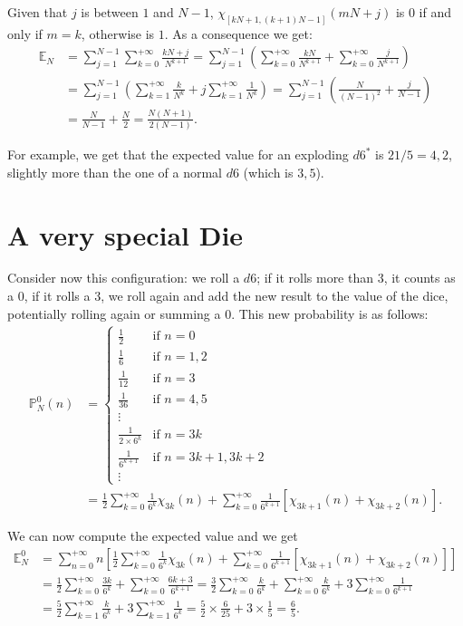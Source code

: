 \documentclass[a4paper,oneside,11pt]{book}
\renewcommand{\Pr}{\mathbb{P}}
\begin{document}
Given that $j$ is between $1$ and $N-1$, $\chi_{[kN+1,\left(k+1\right)N-1]}\left(mN+j\right)$ is $0$ if and only if $m=k$, otherwise is $1$. As a consequence we get:
\begin{align}
	\mathbb{E}_N&=\sum_{j=1}^{N-1}\sum_{k=0}^{+\infty}\frac{kN+j}{N^{k+1}}
	=\sum_{j=1}^{N-1}
	\left(
		\sum_{k=0}^{+\infty}\frac{kN}{N^{k+1}}
		+\sum_{k=0}^{+\infty}\frac{j}{N^{k+1}}
	\right)
\\
	&=\sum_{j=1}^{N-1}
	\left(
		\sum_{k=1}^{+\infty}\frac{k}{N^{k}}
		+j\sum_{k=1}^{+\infty}\frac1{N^k}
	\right)
	=\sum_{j=1}^{N-1}
	\left(
		\frac N{\left(N-1\right)^2}
		+\frac j{N-1}
	\right)
\\
	&=\frac N{N-1}
	+\frac N2
	=\frac{N\left(N+1\right)}{2\left(N-1\right)}.
\end{align}

For example, we get that the expected value for an exploding $d6^*$ is $21/5=4,2$, slightly more than the one of a normal $d6$ (which is $3,5$).

\section{A very special Die}
Consider now this configuration: we roll a $d6$; if it rolls more than $3$, it counts as a $0$, if it rolls a $3$, we roll again and add the new result to the value of the dice, potentially rolling again or summing a $0$. This new probability is as follows:
\begin{align}
	\Pr_N^0\left(n\right)
	&=\left\{\begin{array}{cl}
		\frac12 							& \mbox{if } n=0	\\
		\frac16 							& \mbox{if } n=1,2	\\
		\frac1{12} 						& \mbox{if } n=3	\\
		\frac1{36} 						& \mbox{if } n=4,5	\\
		\vdots								&	\\
		\frac1{2\times6^{k}} 	& \mbox{if } n=3k	\\
		\frac1{6^{k+1}} 			& \mbox{if } n=3k+1,3k+2	\\
		\vdots
	\end{array}\right.
\\
	&=\frac12\sum_{k=0}^{+\infty}\frac1{6^k}\chi_{3k}(n)
	+\sum_{k=0}^{+\infty}\frac1{6^{k+1}}
	\left[
		\chi_{3k+1}(n)
		+\chi_{3k+2}(n)
	\right].
\end{align}

We can now compute the expected value and we get
\begin{align}
	\mathbb{E}_N^0
	&=\sum_{n=0}^{+\infty}n\left[
		\frac12\sum_{k=0}^{+\infty}\frac1{6^k}\chi_{3k}(n)
		+\sum_{k=0}^{+\infty}\frac1{6^{k+1}}
		\left[
			\chi_{3k+1}(n)
			+\chi_{3k+2}(n)
		\right]
	\right]
\\
	&=\frac12\sum_{k=0}^{+\infty}\frac{3k}{6^k}
	+\sum_{k=0}^{+\infty}\frac{6k+3}{6^{k+1}}
	=\frac32\sum_{k=0}^{+\infty}\frac{k}{6^k}
	+\sum_{k=0}^{+\infty}\frac{k}{6^{k}}
	+3\sum_{k=0}^{+\infty}\frac1{6^{k+1}}
\\
	&=\frac52\sum_{k=1}^{+\infty}\frac{k}{6^k}
	+3\sum_{k=1}^{+\infty}\frac1{6^k}
	=\frac52\times\frac6{25}
	+3\times\frac15=\frac65.
\end{align}
\end{document}
